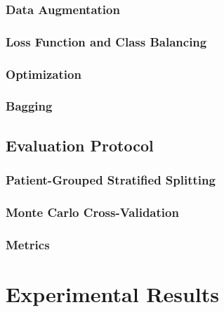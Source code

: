 \documentclass[sigconf,nonacm]{acmart}
\begin{document}
\subsubsection{Data Augmentation}

\subsubsection{Loss Function and Class Balancing}

\subsubsection{Optimization}

\subsubsection{Bagging}

\subsection{Evaluation Protocol}

\subsubsection{Patient-Grouped Stratified Splitting}

\subsubsection{Monte Carlo Cross-Validation}

\subsubsection{Metrics}


\section{Experimental Results}
\label{sec:results}
\end{document}
